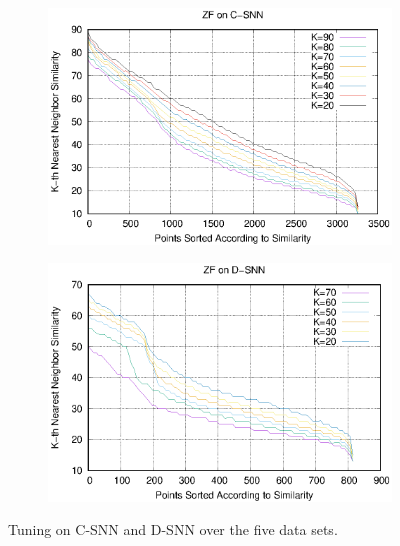 \documentclass[preprint,12pt,authoryear,review]{elsarticle}
\begin{document}
\begin{figure}[!htbp]
\begin{subfigure}[b]{0.37\textwidth}
        \label{fig:sjmn_tun_dsnn}
    \end{subfigure}
    \begin{subfigure}[b]{0.37\textwidth}
        \includegraphics[width=\textwidth]{ZF_C-SNN.eps}
        \label{fig:zf_tun_csnn}
    \end{subfigure}
    \begin{subfigure}[b]{0.37\textwidth}
        \includegraphics[width=\textwidth]{ZF_D-SNN.eps}
        \label{fig:zf_tun_dsnn}
    \end{subfigure}
    \caption{Tuning on C-SNN and D-SNN over the five data sets.}\label{fig:tun_curves}
\end{figure}
\end{document}
